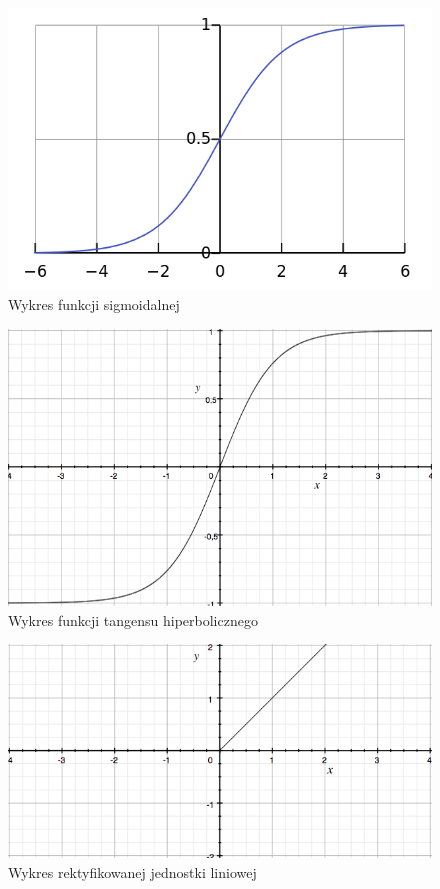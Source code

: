 \documentclass[12pt,a4paper,twoside,titlepage,openright]{book}
\begin{document}
\begin{figure}[ht]
	\centering
			\includegraphics[resolution=100, scale=0.7]{Sigmoid.png}
		\caption{Wykres funkcji sigmoidalnej}
\end{figure}

\begin{figure}[ht]
	\centering
			\includegraphics[resolution=100, scale=0.7]{Tangens.png}
		\caption{Wykres funkcji tangensu hiperbolicznego}
\end{figure}

\begin{figure}[ht]
	\centering
			\includegraphics[resolution=100, scale=0.8]{ReLU.png}
		\caption{Wykres rektyfikowanej jednostki liniowej}
\end{figure}
\end{document}

